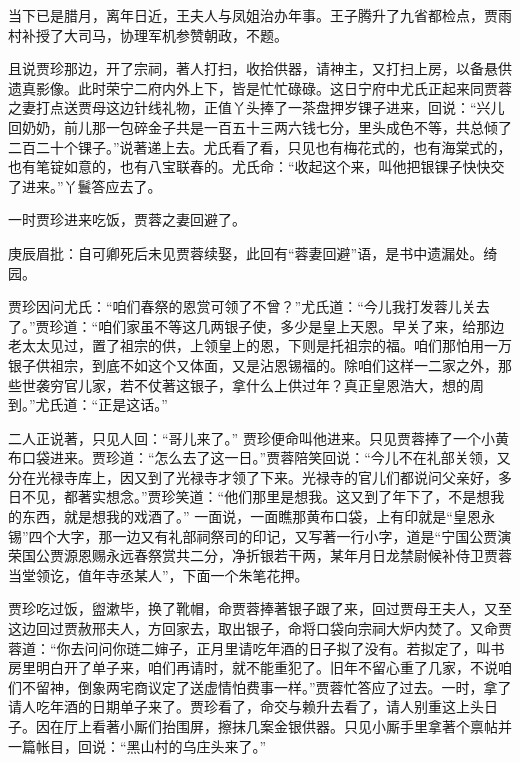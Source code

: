 \begin{parag}
    当下已是腊月，离年日近，王夫人与凤姐治办年事。王子腾升了九省都检点，贾雨村补授了大司马，协理军机参赞朝政，不题。
\end{parag}


\begin{parag}
    且说贾珍那边，开了宗祠，著人打扫，收拾供器，请神主，又打扫上房，以备悬供遗真影像。此时荣宁二府内外上下，皆是忙忙碌碌。这日宁府中尤氏正起来同贾蓉之妻打点送贾母这边针线礼物，正值丫头捧了一茶盘押岁锞子进来，回说：“兴儿回奶奶，前儿那一包碎金子共是一百五十三两六钱七分，里头成色不等，共总倾了二百二十个锞子。”说著递上去。尤氏看了看，只见也有梅花式的，也有海棠式的，也有笔锭如意的，也有八宝联春的。尤氏命：“收起这个来，叫他把银锞子快快交了进来。”丫鬟答应去了。
\end{parag}


\begin{parag}
    一时贾珍进来吃饭，贾蓉之妻回避了。\begin{note}庚辰眉批：自可卿死后未见贾蓉续娶，此回有“蓉妻回避”语，是书中遗漏处。绮园。\end{note}贾珍因问尤氏：“咱们春祭的恩赏可领了不曾？”尤氏道：“今儿我打发蓉儿关去了。”贾珍道：“咱们家虽不等这几两银子使，多少是皇上天恩。早关了来，给那边老太太见过，置了祖宗的供，上领皇上的恩，下则是托祖宗的福。咱们那怕用一万银子供祖宗，到底不如这个又体面，又是沾恩锡福的。除咱们这样一二家之外，那些世袭穷官儿家，若不仗著这银子，拿什么上供过年？真正皇恩浩大，想的周到。”尤氏道：“正是这话。”
\end{parag}


\begin{parag}
    二人正说著，只见人回：“哥儿来了。” 贾珍便命叫他进来。只见贾蓉捧了一个小黄布口袋进来。贾珍道：“怎么去了这一日。”贾蓉陪笑回说：“今儿不在礼部关领，又分在光禄寺库上，因又到了光禄寺才领了下来。光禄寺的官儿们都说问父亲好，多日不见，都著实想念。”贾珍笑道：“他们那里是想我。这又到了年下了，不是想我的东西，就是想我的戏酒了。” 一面说，一面瞧那黄布口袋，上有印就是“皇恩永锡”四个大字，那一边又有礼部祠祭司的印记，又写著一行小字，道是“宁国公贾演荣国公贾源恩赐永远春祭赏共二分，净折银若干两，某年月日龙禁尉候补侍卫贾蓉当堂领讫，值年寺丞某人”，下面一个朱笔花押。
\end{parag}


\begin{parag}
    贾珍吃过饭，盥漱毕，换了靴帽，命贾蓉捧著银子跟了来，回过贾母王夫人，又至这边回过贾赦邢夫人，方回家去，取出银子，命将口袋向宗祠大炉内焚了。又命贾蓉道：“你去问问你琏二婶子，正月里请吃年酒的日子拟了没有。若拟定了，叫书房里明白开了单子来，咱们再请时，就不能重犯了。旧年不留心重了几家，不说咱们不留神，倒象两宅商议定了送虚情怕费事一样。”贾蓉忙答应了过去。一时，拿了请人吃年酒的日期单子来了。贾珍看了，命交与赖升去看了，请人别重这上头日子。因在厅上看著小厮们抬围屏，擦抹几案金银供器。只见小厮手里拿著个禀帖并一篇帐目，回说：“黑山村的乌庄头来了。”
\end{parag}


